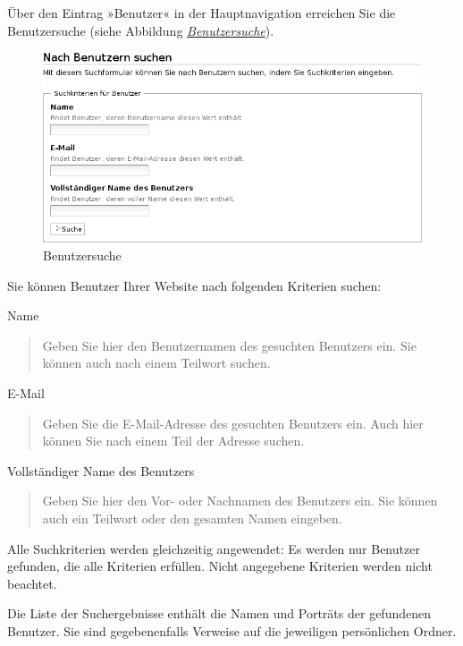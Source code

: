 \documentclass[a4paper,12pt,ngerman]{manual}
\begin{document}
Über den Eintrag »Benutzer« in der Hauptnavigation erreichen Sie die
Benutzersuche (siehe Abbildung \hyperlink{fig-benutzersuche}{\emph{Benutzersuche}}).
\hypertarget{fig-benutzersuche}{}\begin{figure}[htbp]
\centering

\includegraphics{benutzersuche.png}
\caption{Benutzersuche}\end{figure}

Sie können Benutzer Ihrer Website nach folgenden Kriterien suchen:

Name
\begin{quote}

Geben Sie hier den Benutzernamen des gesuchten Benutzers
ein. Sie können auch nach einem Teilwort suchen.
\end{quote}

E-Mail
\begin{quote}

Geben Sie die E-Mail-Adresse des gesuchten Benutzers ein.
Auch hier können Sie nach einem Teil der Adresse suchen.
\end{quote}

Vollständiger Name des Benutzers
\begin{quote}

Geben Sie hier den Vor- oder Nachnamen
des Benutzers ein. Sie können auch ein Teilwort oder den gesamten Namen
eingeben.
\end{quote}

Alle Suchkriterien werden gleichzeitig angewendet: Es werden nur Benutzer
gefunden, die alle Kriterien erfüllen. Nicht angegebene Kriterien
werden nicht beachtet.

Die Liste der Suchergebnisse enthält die Namen und Porträts der gefundenen
Benutzer. Sie sind gegebenenfalls Verweise auf die jeweiligen persönlichen
Ordner.

\resetcurrentobjects
\hypertarget{--doc-benutzer/gruppen}{}
\end{document}
